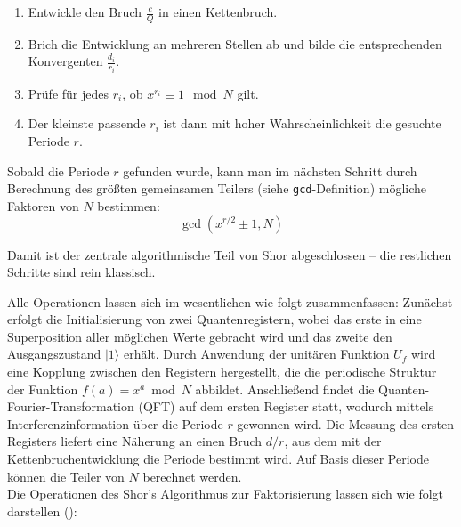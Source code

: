 \begin{enumerate}
\begin{enumerate}
    \item Entwickle den Bruch \( \frac{c}{Q} \) in einen Kettenbruch.
    \item Brich die Entwicklung an mehreren Stellen ab und bilde die entsprechenden Konvergenten \( \frac{d_i}{r_i} \).
    \item Prüfe für jedes \( r_i \), ob \( x^{r_i} \equiv 1 \mod N \) gilt.
    \item Der kleinste passende \( r_i \) ist dann mit hoher Wahrscheinlichkeit die gesuchte Periode \( r \).
\end{enumerate}

\noindent Sobald die Periode \( r \) gefunden wurde, kann man im nächsten Schritt durch Berechnung des größten gemeinsamen Teilers (siehe \texttt{gcd}-Definition) mögliche Faktoren von \( N \) bestimmen:
\[
\gcd(x^{r/2} \pm 1, N)
\]

\noindent Damit ist der zentrale algorithmische Teil von Shor abgeschlossen – die restlichen Schritte sind rein klassisch.\\
\end{enumerate}

\noindent
Alle Operationen lassen sich im wesentlichen wie folgt zusammenfassen: Zunächst erfolgt die Initialisierung von zwei Quantenregistern, wobei das erste in eine Superposition aller möglichen Werte gebracht wird und das zweite den Ausgangszustand \( |1\rangle \) erhält. Durch Anwendung der unitären Funktion \( U_f \) wird eine Kopplung zwischen den Registern hergestellt, die die periodische Struktur der Funktion \( f(a) = x^a \bmod N \) abbildet. Anschließend findet die Quanten-Fourier-Transformation (QFT) auf dem ersten Register statt, wodurch mittels Interferenzinformation über die Periode \( r \) gewonnen wird. Die Messung des ersten Registers liefert eine Näherung an einen Bruch \( d/r \), aus dem mit der Kettenbruchentwicklung die Periode bestimmt wird. Auf Basis dieser Periode können die Teiler von \( N \) berechnet werden. \\

\noindent Die Operationen des Shor's Algorithmus zur Faktorisierung lassen sich wie folgt darstellen (\cite[15-19]{shor_polynomial-time_1994}):

